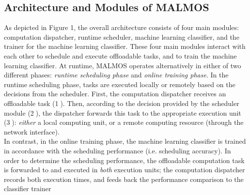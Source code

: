 \documentclass[10pt, conference, compsocconf]{IEEEtran}
\begin{document}
\subsection{Architecture and Modules of MALMOS}
%
As depicted in Figure 1, the overall architecture consists
of four main modules: computation dispatcher, runtime scheduler, machine
learning classifier, and the trainer for the machine learning classifier.
%
These four main modules interact with each other to schedule and
execute offloadable tasks, and to train the machine learning
classifier. 
%
At runtime, MALMOS operates alternatively in either of two different phases:
\textit{runtime scheduling phase} and \textit{online training phase}.
%
In the runtime scheduling phase, tasks are executed locally or remotely
based on the decisions from the scheduler.
%
First, the computation dispatcher receives an offloadable task
(\textcircled{1}).
%
%
Then, according to the decision provided by the scheduler module
(\textcircled{2}), the dispatcher forwards this task to the appropriate
execution unit (\textcircled{3}): \textit{either} a local computing unit, or a
remote computing resource (through the network interface).\\
%
%
\indent In contrast, in the online training phase, the machine
learning classifier is trained in accordance with the scheduling
performance (i.e. scheduling accuracy). 
%
In order to determine the scheduling performance, the offloadable
computation task is forwarded to and executed in \textit{both} execution
units; the computation dispatcher records both execution times, and
feeds back the performance comparison to the classifier trainer
\end{document}
